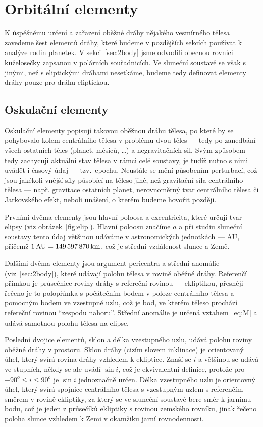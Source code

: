 \documentclass[A4paper, 12pt, oneside]{book}
\begin{document}
\section{Orbitální elementy} \label{sec:orbelem}
K úspěšnému určení a zařazení oběžné dráhy nějakého vesmírného tělesa zavedeme šest elementů dráhy, které budeme v pozdějších sekcích používat k analýze rodin planetek. V sekci~\ref{sec:2body} jsme odvodili obecnou rovnici kuželosečky zapsanou v polárních souřadnicích. Ve sluneční soustavě se však s jinými, než s eliptickými dráhami nesetkáme, budeme tedy definovat elementy dráhy pouze pro dráhu eliptickou.
\subsection{Oskulační elementy}
Oskulační elementy popisují takovou oběžnou dráhu tělesa, po které by se pohybovalo kolem centrálního tělesa v problému dvou těles --- tedy po zanedbání všech ostatních těles (planet, měsíců, \ldots) a negravitačních sil. Svým způsobem tedy zachycují aktuální stav tělesa v rámci celé soustavy, je tudíž nutno s nimi uvádět i časový údaj --- tzv.\ epochu. Neustále se mění působením perturbací, což jsou jakékoli vnější síly působící na těleso jiné, než gravitační síla centrálního tělesa --- např. gravitace ostatních planet, nerovnoměrný tvar centrálního tělesa či Jarkovského efekt, neboli unášení, o kterém budeme hovořit později.

Prvními dvěma elementy jsou hlavní poloosa a excentricita, které určují tvar elipsy (viz obrázek~\ref{fig:elip}). Hlavní poloosu značíme $a$ a při studiu sluneční soustavy tento údaj většinou udáváme v astronomických jednotkách --- AU, přičemž $1\, {\rm AU} = 149\,597\,870\,{\rm km}$, což je střední vzdálenost slunce a Země. 

Dalšími dvěma elementy jsou argument pericentra a střední anomálie (viz~\ref{sec:2body}), které udávají polohu tělesa v rovině oběžné dráhy. Referenčí přímkou je průsečnice roviny dráhy s refereční rovinou --- ekliptikou, přesněji řečeno je to polopřímka s počátečním bodem v poloze centrálního tělesa a pomocným bodem ve vzestupné uzlu, což je bod, ve kterém těleso prochází refereční rovinou \enquote{zespodu nahoru}. Střední anomálie je určená vztahem~\eqref{eq:M} a udává samotnou polohu tělesa na elipse.

Poslední dvojice elementů, sklon a délka vzestupného uzlu, udává polohu roviny oběžné dráhy v prostoru. Sklon dráhy (cizím slovem inklinace) je orientovaný úhel, který svírá rovina dráhy vzhledem k ekliptice. Znaší se $i$ a většinou se udává ve stupních, někdy se ale uvádí $\sin i$, což je ekvivalentní definice, protože pro $-90^o\leq i \leq 90^o$ je $\sin i$ jednoznačně určen. Délka vzestupného uzlu je orientovný úhel, který svírá spojnice centrálního tělesa s vzestupným uzlem s referenčím směrem v rovině ekliptiky, za který se ve sluneční soustavě bere směr k jarnímu bodu, což je jeden z průsečíků ekliptiky s rovinou zemského rovníku, jinak řečeno poloha slunce vzhledem k Zemi v okamžiku jarní rovnodennosti.
\end{document}
